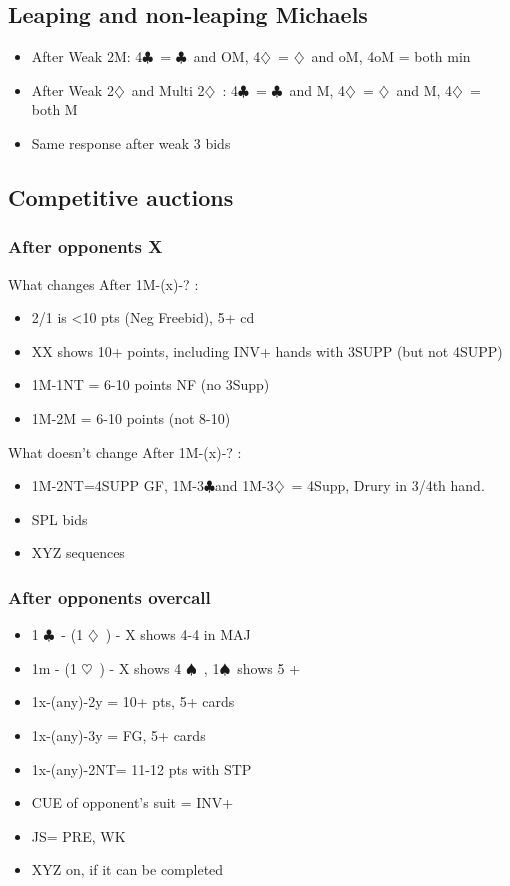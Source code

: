 \documentclass{article}
\newcommand\C{\ensuremath{\clubsuit}}
\newcommand\D{\ensuremath{\diamondsuit}}
\renewcommand\H{\ensuremath{\heartsuit}}
\renewcommand\S{\ensuremath{\spadesuit}}
\begin{document}
\begin{multicols}{2}
 \subsection{Leaping and non-leaping Michaels }
 \label{leaping}
 \begin{itemize}
   \item After Weak 2M: 4\C\ = \C\ and OM, 4\D\ = \D\ and oM, 4oM = both min
   \item After Weak 2\D\ and Multi 2\D\ : 4\C\ = \C\ and M, 4\D\ = \D\ and M, 4\D\ = both M
   \item  Same response after weak 3 bids
 \end{itemize}
  \subsection{Competitive auctions}
  \label{comp}
  \subsubsection{After opponents X}
  What changes After 1M-(x)-?  :
  \begin{itemize}
    \item 2/1 is <10 pts (Neg Freebid), 5+ cd
    \item XX shows 10+ points, including INV+ hands with 3SUPP (but not 4SUPP)
    \item 1M-1NT = 6-10 points NF (no 3Supp)
    \item 1M-2M = 6-10 points (not 8-10)
  \end{itemize}
  What doesn't change After 1M-(x)-?  :
  \begin{itemize}
    \item 1M-2NT=4SUPP GF, 1M-3\C and 1M-3\D\ = 4Supp, Drury in 3/4th hand. 
    \item SPL bids
    \item XYZ sequences
  \end{itemize}
  \subsubsection{After opponents overcall}
  \begin{itemize}
    \item 1 \C\ - (1 \D\ ) - X shows 4-4 in MAJ 
    \item 1m - (1 \H\ ) - X shows 4 \S\ , 1\S\  shows 5 +
    \item 1x-(any)-2y = 10+ pts, 5+  cards
    \item 1x-(any)-3y = FG, 5+  cards
    \item 1x-(any)-2NT= 11-12 pts with STP
    \item CUE of opponent's suit = INV+
    \item JS= PRE, WK
    \item XYZ on, if it can be completed
  \end{itemize}

\end{multicols}
\end{document}
